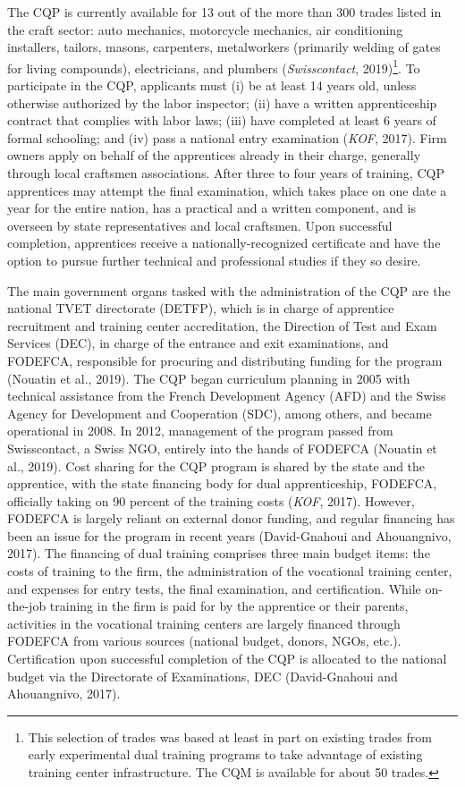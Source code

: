 \documentclass[
  11pt,
a4paper
]{article}
\begin{document}
The CQP is currently available for 13 out of the more than 300 trades listed in the craft sector: auto mechanics, motorcycle mechanics, air conditioning installers, tailors, masons, carpenters, metalworkers (primarily welding of gates for living compounds), electricians, and plumbers (\emph{Swisscontact}, 2019)\footnote{This selection of trades was based at least in part on existing trades from early experimental dual training programs to take advantage of existing training center infrastructure. The CQM is available for about 50 trades.}. To participate in the CQP, applicants must (i) be at least 14 years old, unless otherwise authorized by the labor inspector; (ii) have a written apprenticeship contract that complies with labor laws; (iii) have completed at least 6 years of formal schooling; and (iv) pass a national entry examination (\emph{{KOF}}, 2017). Firm owners apply on behalf of the apprentices already in their charge, generally through local craftsmen associations. After three to four years of training, CQP apprentices may attempt the final examination, which takes place on one date a year for the entire nation, has a practical and a written component, and is overseen by state representatives and local craftsmen. Upon successful completion, apprentices receive a nationally-recognized certificate and have the option to pursue further technical and professional studies if they so desire.

The main government organs tasked with the administration of the CQP are the national TVET directorate (DETFP), which is in charge of apprentice recruitment and training center accreditation, the Direction of Test and Exam Services (DEC), in charge of the entrance and exit examinations, and FODEFCA, responsible for procuring and distributing funding for the program (Nouatin et al., 2019). The CQP began curriculum planning in 2005 with technical assistance from the French Development Agency (AFD) and the Swiss Agency for Development and Cooperation (SDC), among others, and became operational in 2008. In 2012, management of the program passed from Swisscontact, a Swiss NGO, entirely into the hands of FODEFCA (Nouatin et al., 2019). Cost sharing for the CQP program is shared by the state and the apprentice, with the state financing body for dual apprenticeship, FODEFCA, officially taking on 90 percent of the training costs (\emph{{KOF}}, 2017). However, FODEFCA is largely reliant on external donor funding, and regular financing has been an issue for the program in recent years (David-Gnahoui and Ahouangnivo, 2017). The financing of dual training comprises three main budget items: the costs of training to the firm, the administration of the vocational training center, and expenses for entry tests, the final examination, and certification. While on-the-job training in the firm is paid for by the apprentice or their parents, activities in the vocational training centers are largely financed through FODEFCA from various sources (national budget, donors, NGOs, etc.). Certification upon successful completion of the CQP is allocated to the national budget via the Directorate of Examinations, DEC (David-Gnahoui and Ahouangnivo, 2017).
\end{document}
